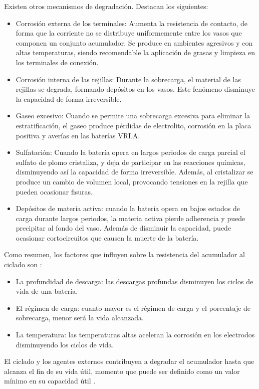 Existen otros mecanismos de degradación. Destacan los siguientes:
\begin{itemize}
\item Corrosión\textbf{\emph{ }}externa\textbf{ }de los terminales: Aumenta
la resistencia de contacto, de forma que la corriente no se distribuye
uniformemente entre los vasos que componen un conjunto acumulador.
Se produce en ambientes agresivos y con altas temperaturas, siendo
recomendable la aplicación de grasas y limpieza en los terminales
de conexión.
\item Corrosión interna de las rejillas: Durante la sobrecarga, el material
de las rejillas se degrada, formando depósitos en los vasos. Este
fenómeno disminuye la capacidad de forma irreversible.
\item Gaseo excesivo: Cuando se permite una sobrecarga excesiva para eliminar
la estratificación, el gaseo produce pérdidas de electrolito, corrosión
en la placa positiva y averías en las baterías VRLA.
\item Sulfatación: Cuando la batería opera en largos periodos de carga parcial
el sulfato de plomo cristaliza, y deja de participar en las reacciones
químicas, disminuyendo así la capacidad de forma irreversible. Además,
al cristalizar se produce un cambio de volumen local, provocando tensiones
en la rejilla que pueden ocasionar fisuras.
\item Depósitos de materia activa: cuando la batería opera en bajos estados
de carga durante largos periodos, la materia activa pierde adherencia
y puede precipitar al fondo del vaso. Además de disminuir la capacidad,
puede ocasionar cortocircuitos que causen la muerte de la batería.
\end{itemize}
Como resumen, los factores que influyen sobre la resistencia del acumulador
al ciclado son \citep{Fullea1994}:
\needspace{3\onelineskip}
\begin{itemize}
\item La profundidad de descarga: las descargas profundas disminuyen los
ciclos de vida de una batería.
\item El régimen de carga: cuanto mayor es el régimen de carga y el porcentaje
de sobrecarga, menor será la vida alcanzada.
\item La temperatura: las temperaturas altas aceleran la corrosión en los
electrodos disminuyendo los ciclos de vida.
\end{itemize}
El ciclado y los agentes externos contribuyen a degradar el acumulador
hasta que alcanza el fin de su vida útil, momento que puede ser definido
como un valor mínimo en su capacidad útil \citep{Egido.Lorenzo1998}.


